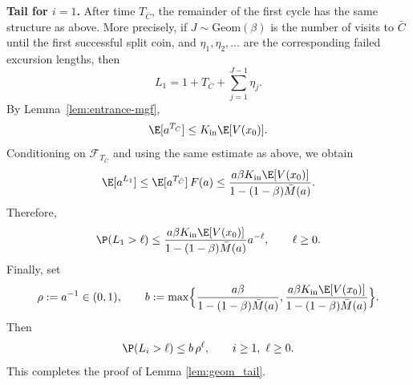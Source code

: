 \documentclass[mnsc,nonblindrev]{informs3}
\begin{document}
\medskip
\noindent
\textbf{Tail for \(i=1\).}
After time \(T_{\bar C}\), the remainder of the first cycle has the same structure
as above. More precisely, if \(J\sim\mathrm{Geom}(\beta)\) is the number of visits
to \(\bar C\) until the first successful split coin, and \(\eta_1,\eta_2,\dots\)
are the corresponding failed excursion lengths, then
\[
L_1=1+ T_{\bar C}+\sum_{j=1}^{J-1}\eta_j.
\]
By Lemma~\ref{lem:entrance-mgf},
\[
\E[a^{T_{\bar C}}]\le K_{\mathrm{in}}\E[V(x_0)].
\]
Conditioning on \(\mathcal F_{T_{\bar C}}\) and using the same estimate as above,
we obtain
\[
\E[a^{L_1}]
\le \E[a^{T_{\bar C}}]\,F(a)
\le \frac{a\beta K_{\mathrm{in}}\E[V(x_0)]}{1-(1-\beta) \bar{M}(a)}.
\]
Therefore,
\[
\P(L_1>\ell)\le \frac{a\beta K_{\mathrm{in}}\E[V(x_0)]}{1-(1-\beta) \bar{M}(a)} a^{-\ell},
\qquad \ell\ge0.
\]
Finally, set
\[
\rho:=a^{-1}\in(0,1),
\qquad
b:=\max\Bigl\{\frac{a\beta }{1-(1-\beta) \bar{M}(a)},\frac{a\beta K_{\mathrm{in}}\E[V(x_0)]}{1-(1-\beta) \bar{M}(a)}\Bigr\}.
\]
Then
\[
\P(L_i>\ell)\le b\,\rho^\ell,
\qquad i\ge1,\ \ell\ge0.
\]
This completes the proof of Lemma \ref{lem:geom_tail}.
\end{document}

